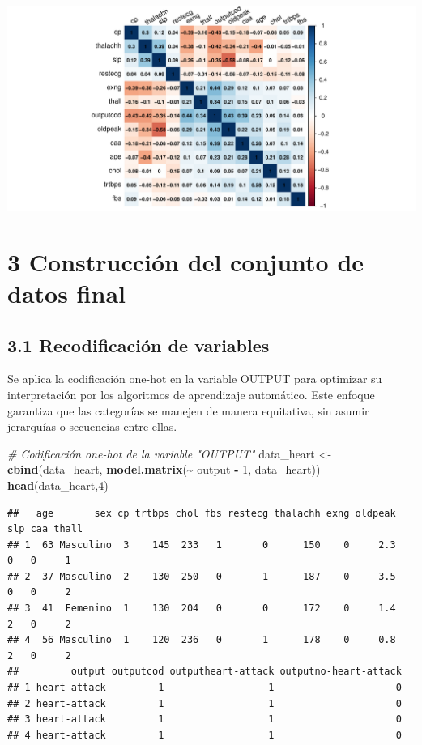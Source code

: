 \documentclass[
]{article}
\newenvironment{Shaded}{\begin{snugshade}}{\end{snugshade}}
\newcommand{\CommentTok}[1]{\textcolor[rgb]{0.56,0.35,0.01}{\textit{#1}}}
\newcommand{\DecValTok}[1]{\textcolor[rgb]{0.00,0.00,0.81}{#1}}
\newcommand{\FunctionTok}[1]{\textcolor[rgb]{0.13,0.29,0.53}{\textbf{#1}}}
\newcommand{\NormalTok}[1]{#1}
\newcommand{\OtherTok}[1]{\textcolor[rgb]{0.56,0.35,0.01}{#1}}
\newcommand{\SpecialCharTok}[1]{\textcolor[rgb]{0.81,0.36,0.00}{\textbf{#1}}}
\begin{document}
\includegraphics{coyolaf_ChristianOyola-PRA2_files/figure-latex/unnamed-chunk-23-1.pdf}

\hypertarget{construcciuxf3n-del-conjunto-de-datos-final}{%
\section{3 Construcción del conjunto de datos
final}\label{construcciuxf3n-del-conjunto-de-datos-final}}

\hypertarget{recodificaciuxf3n-de-variables}{%
\subsection{3.1 Recodificación de
variables}\label{recodificaciuxf3n-de-variables}}

Se aplica la codificación one-hot en la variable OUTPUT para optimizar
su interpretación por los algoritmos de aprendizaje automático. Este
enfoque garantiza que las categorías se manejen de manera equitativa,
sin asumir jerarquías o secuencias entre ellas.

\begin{Shaded}
\begin{Highlighting}[]
\CommentTok{\# Codificación one{-}hot de la variable "OUTPUT"}
\NormalTok{data\_heart }\OtherTok{\textless{}{-}} \FunctionTok{cbind}\NormalTok{(data\_heart, }\FunctionTok{model.matrix}\NormalTok{(}\SpecialCharTok{\textasciitilde{}}\NormalTok{ output }\SpecialCharTok{{-}} \DecValTok{1}\NormalTok{, data\_heart))}
\FunctionTok{head}\NormalTok{(data\_heart,}\DecValTok{4}\NormalTok{)}
\end{Highlighting}
\end{Shaded}

\begin{verbatim}
##   age       sex cp trtbps chol fbs restecg thalachh exng oldpeak slp caa thall
## 1  63 Masculino  3    145  233   1       0      150    0     2.3   0   0     1
## 2  37 Masculino  2    130  250   0       1      187    0     3.5   0   0     2
## 3  41  Femenino  1    130  204   0       0      172    0     1.4   2   0     2
## 4  56 Masculino  1    120  236   0       1      178    0     0.8   2   0     2
##         output outputcod outputheart-attack outputno-heart-attack
## 1 heart-attack         1                  1                     0
## 2 heart-attack         1                  1                     0
## 3 heart-attack         1                  1                     0
## 4 heart-attack         1                  1                     0
\end{verbatim}
\end{document}
